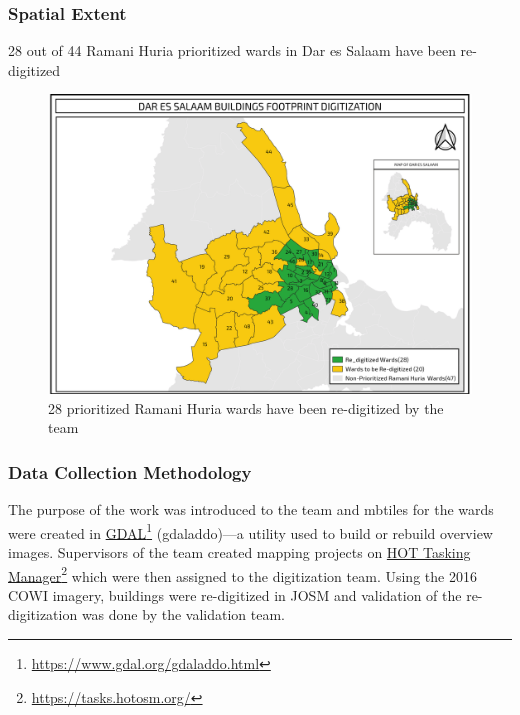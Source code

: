 \documentclass[a4paper,12pt,twoside]{article}
\begin{document}
\subsubsection{Spatial Extent}
28 out of 44 Ramani Huria prioritized wards in Dar es Salaam have been re-digitized
\begin{figure}[h]
  \caption{28 prioritized Ramani Huria wards have been re-digitized by the team}
  \centering
  \includegraphics[width=1\textwidth]{images/Building_Footprint_Digitization.png}
\end{figure}


\subsubsection{Data Collection Methodology}

The purpose of the work was introduced to the team and mbtiles for the wards were created in \href{https://www.gdal.org/gdaladdo.html}{GDAL}\footnote{\url{https://www.gdal.org/gdaladdo.html}} (gdaladdo)---a utility used to build or rebuild overview images. Supervisors of the team created mapping projects on \href{https://tasks.hotosm.org/}{HOT Tasking Manager}\footnote{\url{https://tasks.hotosm.org/}} which were then assigned to the digitization team. Using the 2016 COWI imagery, buildings were re-digitized in JOSM and validation of the re-digitization was done by the validation team.

\medskip
\end{document}
